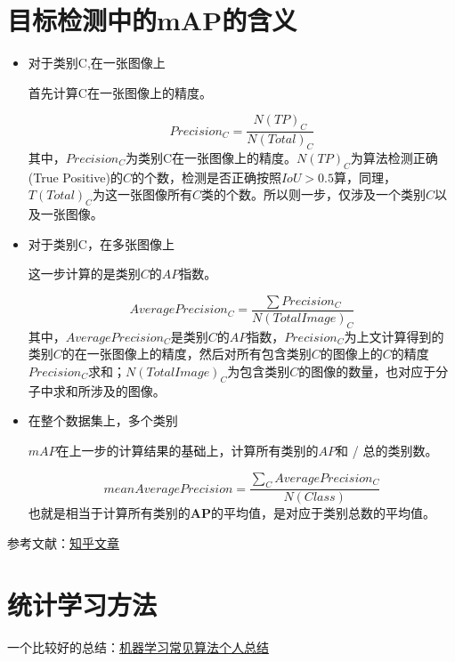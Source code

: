 \section{目标检测中的mAP的含义}

\begin{itemize}
\item 对于类别C,在一张图像上

首先计算C在一张图像上的精度。

\begin{displaymath}
\label{PrecisionC1}
Precision_C = \frac{N(TP)_C}{N(Total)_C}
\end{displaymath}
其中，$Precision_C$为类别C在一张图像上的精度。$N(TP)_C$为算法检测正确(True Positive)的$C$的个数，检测是否正确按照$IoU > 0.5$算，同理，$T(Total)_C$为这一张图像所有$C$类的个数。所以则一步，仅涉及一个类别$C$以及一张图像。

\item 对于类别C，在多张图像上

这一步计算的是类别$C$的$AP$指数。

\begin{displaymath}
\label{PrecisionC2}
AveragePrecision_C = \frac{\sum Precision_C}{N(TotalImage)_C}
\end{displaymath}
其中，$AveragePrecision_C$是类别$C$的$AP$指数，$Precision_C$为上文计算得到的类别$C$的在一张图像上的精度，然后对所有包含类别$C$的图像上的$C$的精度$Precision_C$求和；$N(TotalImage)_C$为包含类别$C$的图像的数量，也对应于分子中求和所涉及的图像。

\item 在整个数据集上，多个类别

$mAP$在上一步的计算结果的基础上，计算所有类别的$AP$和 / 总的类别数。

\begin{displaymath}
\label{PrecisionC3}
meanAveragePrecision = \frac{\sum_{C} AveragePrecision_C}{N(Class)}
\end{displaymath}
也就是相当于计算所有类别的$\mathbf{AP}$的平均值，是对应于类别总数的平均值。

\end{itemize}

参考文献：\href{https://www.zhihu.com/question/53405779}{知乎文章}

\section{统计学习方法}

一个比较好的总结：\href{http://kubicode.me/2015/08/16/Machine%20Learning/Algorithm-Summary-for-Interview/#SVM%E3%80%81SMO}{机器学习常见算法个人总结}


